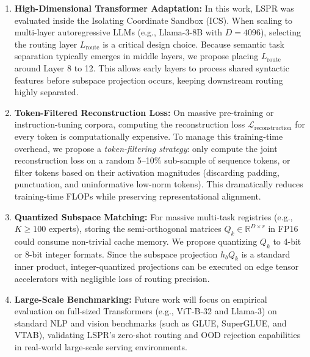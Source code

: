 \begin{enumerate}
    \item \textbf{High-Dimensional Transformer Adaptation:} In this work, LSPR was evaluated inside the Isolating Coordinate Sandbox (ICS). When scaling to multi-layer autoregressive LLMs (e.g., Llama-3-8B with $D=4096$), selecting the routing layer $L_{\text{route}}$ is a critical design choice. Because semantic task separation typically emerges in middle layers, we propose placing $L_{\text{route}}$ around Layer 8 to 12. This allows early layers to process shared syntactic features before subspace projection occurs, keeping downstream routing highly separated.
    \item \textbf{Token-Filtered Reconstruction Loss:} On massive pre-training or instruction-tuning corpora, computing the reconstruction loss $\mathcal{L}_{\text{reconstruction}}$ for every token is computationally expensive. To manage this training-time overhead, we propose a \textit{token-filtering strategy}: only compute the joint reconstruction loss on a random 5--10\% sub-sample of sequence tokens, or filter tokens based on their activation magnitudes (discarding padding, punctuation, and uninformative low-norm tokens). This dramatically reduces training-time FLOPs while preserving representational alignment.
    \item \textbf{Quantized Subspace Matching:} For massive multi-task registries (e.g., $K \ge 100$ experts), storing the semi-orthogonal matrices $Q_k \in \mathbb{R}^{D \times r}$ in FP16 could consume non-trivial cache memory. We propose quantizing $Q_k$ to 4-bit or 8-bit integer formats. Since the subspace projection $h_b Q_k$ is a standard inner product, integer-quantized projections can be executed on edge tensor accelerators with negligible loss of routing precision.
    \item \textbf{Large-Scale Benchmarking:} Future work will focus on empirical evaluation on full-sized Transformers (e.g., ViT-B-32 and Llama-3) on standard NLP and vision benchmarks (such as GLUE, SuperGLUE, and VTAB), validating LSPR's zero-shot routing and OOD rejection capabilities in real-world large-scale serving environments.
\end{enumerate}
